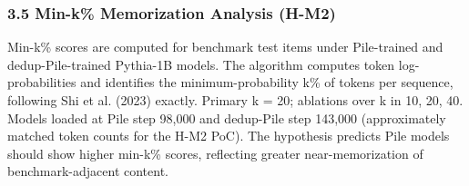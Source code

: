 \subsubsection{3.5 Min-k\% Memorization Analysis (H-M2)}

Min-k\% scores \citep{Shi2023Detecting} are computed for benchmark test items under Pile-trained and dedup-Pile-trained Pythia-1B models. The algorithm computes token log-probabilities and identifies the minimum-probability k\% of tokens per sequence, following Shi et al. (2023) exactly. Primary k = 20; ablations over k in {10, 20, 40}. Models loaded at Pile step 98,000 and dedup-Pile step 143,000 (approximately matched token counts for the H-M2 PoC). The hypothesis predicts Pile models should show higher min-k\% scores, reflecting greater near-memorization of benchmark-adjacent content.

